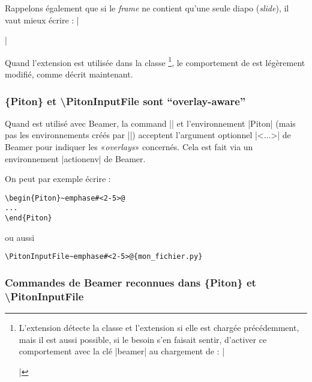 \documentclass[dvipsnames,svgnames]{article}
\begin{document}
Rappelons également que si le \emph{frame} ne contient qu'une seule diapo (\emph{slide}),
il vaut mieux écrire : |\begin{frame}[fragile=singleslide]|

\medskip
Quand l'extension  est utilisée dans la classe
\footnote{L'extension  détecte la classe  et
  l'extension  si elle est chargée précédemment, mais il est aussi
  possible, si le besoin s'en faisait sentir, d'activer ce comportement avec la clé
  |beamer| au chargement de  : |\usepackage[beamer]{piton}|}, le comportement
de  est légèrement modifié, comme décrit maintenant.

\subsubsection{\{Piton\} et \textbackslash PitonInputFile sont ``overlay-aware''}

Quand  est utilisé avec Beamer, la command |\PitonInputFile| et
l'environnement |{Piton}| (mais pas les environnements créés par
|\NewPitonEnvironment|) acceptent l'argument optionnel |<...>| de Beamer pour
indiquer les «\emph{overlays}» concernés. Cela est fait via un environnement |{actionenv}|
de Beamer.

On peut par exemple écrire :

\begin{Verbatim}
\begin{Piton}~emphase#<2-5>@
...
\end{Piton}
\end{Verbatim}

ou aussi 

\begin{Verbatim}
\PitonInputFile~emphase#<2-5>@{mon_fichier.py}
\end{Verbatim}



\subsubsection{Commandes de Beamer reconnues dans \{Piton\} et \textbackslash PitonInputFile}



\end{frame}
\end{document}

